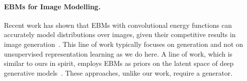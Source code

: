 \documentclass{article}
\begin{document}






\paragraph{EBMs for Image Modelling.} Recent work has shown that EBMs with convolutional energy functions can accurately model distributions over images, given their competitive results in image generation~\citep{xie2016theory,nijkamp2019anatomy,nijkamp2019learning, du2019implicit}. This line of work typically focuses on generation and not on unsupervised representation learning as we do here. A line of work, which is similar to ours in spirit, employs EBMs as priors on the latent space of deep generative models~\citep{pang2020learning,aneja2020ncp}. These approaches, unlike our work, require a generator.
\end{document}
